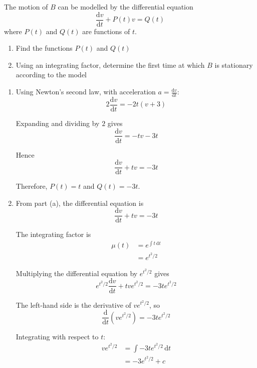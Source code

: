 \documentclass[leqno]{article}
\begin{document}
\begin{enumerate}[
  label=\textbf{\arabic*.},
  leftmargin=*,
  topsep=0pt,
  partopsep=0pt,
  parsep=0pt
]
The motion of $B$ can be modelled by the differential equation
\[
\frac{\mathrm{d}v}{\mathrm{d}t}+P(t)v=Q(t)
\]
where $P(t)$ and $Q(t)$ are functions of $t$. \\
\begin{enumerate}[label=\textbf{(\alph*)}]
  \item Find the functions $P(t)$ and $Q(t)$  \\
  \item Using an integrating factor, determine the first time at which $B$ is stationary according to the model  \\
\end{enumerate}

\vspace*{10pt}

\begin{djsSolution}
\begin{enumerate}[label=\textbf{(\alph*)}]
  \item Using Newton's second law, with acceleration $a=\frac{\mathrm{d}v}{\mathrm{d}t}$:
  \[
  2\frac{\mathrm{d}v}{\mathrm{d}t}=-2t(v+3)
  \]

  Expanding and dividing by $2$ gives
  \[
  \frac{\mathrm{d}v}{\mathrm{d}t}=-tv-3t
  \]

  Hence
  \[
  \frac{\mathrm{d}v}{\mathrm{d}t}+tv=-3t
  \]

  Therefore, $P(t)=t$ and $Q(t)=-3t$.

  \item From part (a), the differential equation is
  \[
  \frac{\mathrm{d}v}{\mathrm{d}t}+tv=-3t
  \]

  The integrating factor is
  \begin{align*}
  \mu(t)&=e^{\int t\,\mathrm{d}t}\\
  &=e^{t^2/2}
  \end{align*}

  Multiplying the differential equation by $e^{t^2/2}$ gives
  \[
  e^{t^2/2}\frac{\mathrm{d}v}{\mathrm{d}t}+tve^{t^2/2}=-3te^{t^2/2}
  \]

  The left-hand side is the derivative of $ve^{t^2/2}$, so
  \[
  \frac{\mathrm{d}}{\mathrm{d}t}\left(ve^{t^2/2}\right)=-3te^{t^2/2}
  \]

  Integrating with respect to $t$:
  \begin{align*}
  ve^{t^2/2} &= \int -3te^{t^2/2}\,\mathrm{d}t \\
  &= -3e^{t^2/2}+c
  \end{align*}


\end{enumerate}
\end{djsSolution}
\end{enumerate}
\end{document}
